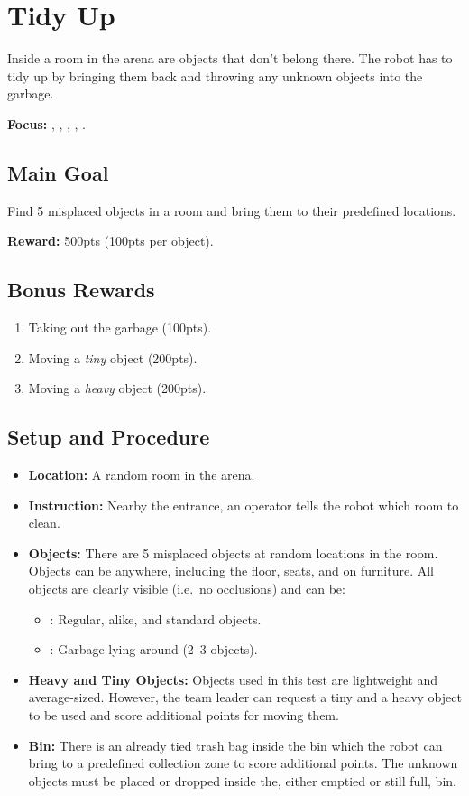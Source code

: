 \section{Tidy Up}
\label{test:tidy-up}
 Inside a room in the arena are objects that don't belong there. The robot has to tidy up by bringing them back and throwing any unknown objects into the garbage.

\noindent \textbf{Focus:} \SysI, \NAV, \CV, \OR, \MAN.

\subsection*{Main Goal}
Find 5 misplaced objects in a room and bring them to their predefined locations.

\noindent\textbf{Reward:} 500pts (100pts per object).

\subsection*{Bonus Rewards}
\begin{enumerate}[nosep]
	\item Taking out the garbage (100pts).
	\item Moving a \emph{tiny} object (200pts).
	\item Moving a \emph{heavy} object (200pts).
\end{enumerate}


\subsection*{Setup and Procedure}
\begin{itemize}[nosep]
	\item \textbf{Location:} A random room in the arena.
	\item \textbf{Instruction:} Nearby the entrance, an operator tells the robot which room to clean.
	\item \textbf{Objects:} There are 5 misplaced objects at random locations in the room. Objects can be anywhere, including the floor, seats, and on furniture.
	All objects are clearly visible (i.e.~no occlusions) and can be:
	\begin{itemize}[nosep]
		\item\KnownObjects{}: Regular, alike, and standard objects.
		\item\UnknownObjects{}: Garbage lying around (2--3 objects).
	\end{itemize}
	\item \textbf{Heavy and Tiny Objects:} Objects used in this test are lightweight and average-sized.
	However, the team leader can request a tiny and a heavy object to be used and score additional points for moving them.
	\item \textbf{Bin:} There is an already tied trash bag inside the bin which the robot can bring to a predefined collection zone to score additional points. The unknown objects must be placed or dropped inside the, either emptied or still full, bin.
\end{itemize}

